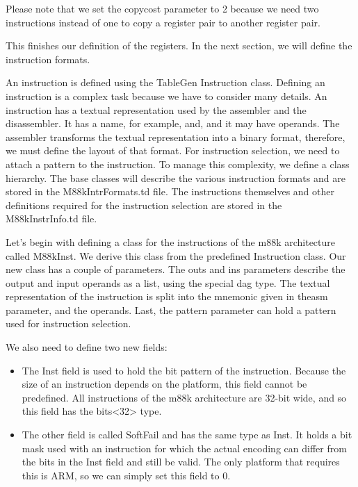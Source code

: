 Please note that we set the copycost parameter to 2 because we need two instructions instead of one to copy a register pair to another register pair.

This finishes our definition of the registers. In the next section, we will define the instruction formats.


An instruction is defined using the TableGen Instruction class. Defining an instruction is a complex task because we have to consider many details. An instruction has a textual representation used by the assembler and the disassembler. It has a name, for example, and, and it may have operands. The assembler transforms the textual representation into a binary format, therefore, we must define the layout of that format. For instruction selection, we need to attach a pattern to the instruction. To manage this complexity, we define a class hierarchy. The base classes will describe the various instruction formats and are stored in the M88kIntrFormats.td file. The instructions themselves and other definitions required for the instruction selection are stored in the M88kInstrInfo.td file.

Let’s begin with defining a class for the instructions of the m88k architecture called M88kInst. We derive this class from the predefined Instruction class. Our new class has a couple of parameters. The outs and ins parameters describe the output and input operands as a list, using the special dag type. The textual representation of the instruction is split into the mnemonic given in theasm parameter, and the operands. Last, the pattern parameter can hold a pattern used for instruction selection.

We also need to define two new fields:

\begin{itemize}
\item
The Inst field is used to hold the bit pattern of the instruction. Because the size of an instruction depends on the platform, this field cannot be predefined. All instructions of the m88k architecture are 32-bit wide, and so this field has the bits<32> type.

\item
The other field is called SoftFail and has the same type as Inst. It holds a bit mask used with an instruction for which the actual encoding can differ from the bits in the Inst field and still be valid. The only platform that requires this is ARM, so we can simply set this field to 0.
\end{itemize}

